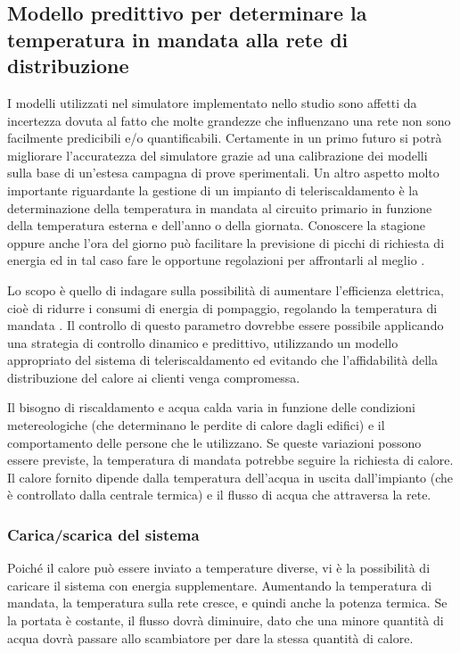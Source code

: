 \documentclass[laurea,oneside,11pt]{USiena_tesiLM3}
\begin{document}
\subsection{Modello predittivo per determinare la temperatura in mandata alla rete di distribuzione}
I modelli utilizzati nel simulatore implementato nello studio sono affetti da incertezza dovuta al fatto che molte grandezze che influenzano una rete non sono facilmente predicibili e/o quantificabili.
Certamente in un primo futuro si potrà migliorare l'accuratezza del simulatore grazie ad una calibrazione dei modelli sulla base di un'estesa campagna di prove sperimentali. 
Un altro aspetto molto importante riguardante la gestione di un impianto di teleriscaldamento è la determinazione della temperatura in mandata al circuito primario in funzione della temperatura esterna e dell'anno o della giornata. Conoscere la stagione oppure anche l'ora del giorno può facilitare la previsione di picchi di richiesta di energia ed in tal caso fare le opportune regolazioni per affrontarli al meglio \cite{sandou2005predictive}.

Lo scopo è quello di indagare sulla possibilità di aumentare l'efficienza elettrica, cioè di ridurre i consumi di energia di pompaggio, regolando la temperatura di mandata \cite{zinko}.
Il controllo di questo parametro dovrebbe essere possibile applicando una strategia di controllo dinamico e predittivo, utilizzando un modello appropriato del sistema di teleriscaldamento ed evitando che l'affidabilità della distribuzione del calore ai clienti venga compromessa.

Il bisogno di riscaldamento e acqua calda varia in funzione delle condizioni metereologiche (che determinano le perdite di calore dagli edifici) e il comportamento delle persone che le utilizzano. Se queste variazioni possono essere previste, la temperatura di mandata potrebbe seguire la richiesta di calore. Il calore fornito  dipende dalla temperatura dell'acqua in uscita dall'impianto (che è controllato dalla centrale termica) e il flusso di acqua che attraversa la rete. 

\subsubsection{Carica/scarica del sistema}
Poiché il calore può essere inviato a temperature diverse, vi è la possibilità di caricare il sistema con energia supplementare.
Aumentando la temperatura di mandata, la temperatura sulla rete cresce, e quindi anche la potenza termica. Se la portata è costante, il flusso dovrà diminuire, dato che una minore quantità di acqua dovrà passare allo scambiatore per dare la stessa quantità di calore. 
\end{document}
